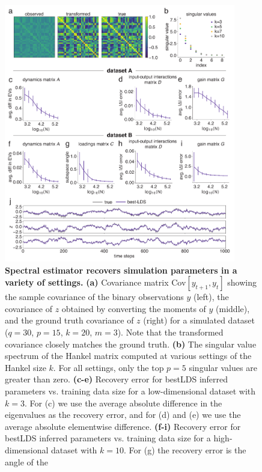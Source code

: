 \begin{figure}[t!]
\centering
\includegraphics[width=0.90\textwidth]{ch4-bestlds/bestlds-figures/fig2.pdf}
\caption[Spectral estimator recovers simulation parameters in a variety of settings]{\textbf{Spectral estimator recovers simulation parameters in a variety of settings.} \textbf{(a)} Covariance matrix Cov$[y_{t+1}, y_{t}]$ showing the sample covariance of the binary observations $y$ (left), the covariance of $z$ obtained by converting the moments of $y$ (middle), and the ground truth covariance of $z$ (right) for a simulated dataset ($q = 30$, $p = 15$, $k =20$, $m=3$). Note that the transformed covariance closely matches the ground truth. \textbf{(b)} The singular value spectrum of the Hankel matrix computed at various settings of the Hankel size $k$. For all settings, only the top $p=5$ singular values are greater than zero. \textbf{(c-e)} Recovery error for bestLDS inferred parameters vs. training data size for a low-dimensional dataset with $ k=3$. For (c) we use the average absolute difference in the eigenvalues as the recovery error, and for (d) and (e) we use the average absolute elementwise difference. \textbf{(f-i)} Recovery error for bestLDS inferred parameters vs. training data size for a high-dimensional dataset with $k=10$. For (g) the recovery error is the angle of the }
\vspace{-0.5cm}
\label{fig:bestlds:2}
\end{figure}
\begin{figure}[t!]
\end{figure}

